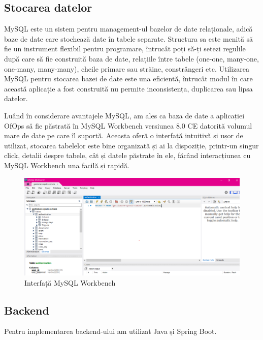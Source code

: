 \subsection{Stocarea datelor}
\hspace{1cm}MySQL este un sistem pentru management-ul bazelor de date relaționale, adică baze de date care stochează date în tabele separate.\cite{citation2} Structura sa este menită să fie un instrument flexibil pentru programare, întrucât poți să-ți setezi regulile după care să fie construită baza de date, relațiile între tabele (one-one, many-one, one-many, many-many), cheile primare sau străine, constrângeri etc. Utilizarea MySQL pentru stocarea bazei de date este una eficientă, întrucât modul în care această aplicație a fost construită nu permite inconsistența, duplicarea sau lipsa datelor.

Luând în considerare avantajele MySQL, am ales ca baza de date a aplicației OfOps să fie păstrată în MySQL Workbench versiunea 8.0 CE datorită volumul mare de date pe care îl suportă. Aceasta oferă o interfață intuitivă și ușor de utilizat, stocarea tabelelor este bine organizată și ai la dispoziție, printr-un singur click, detalii despre tabele, cât și datele păstrate în ele, făcând interacțiunea cu MySQL Workbench una facilă și rapidă.


\begin{figure}[!htb]
    \centering
    \includegraphics[width=0.9\linewidth]{images/interfata-mysql.png}
    \caption{Interfață MySQL Workbench}
    \label{fig:interfata-mysql}
\end{figure}


\subsection{Backend}
\hspace{1cm} Pentru implementarea backend-ului am utilizat Java și Spring Boot. 

\newpage

